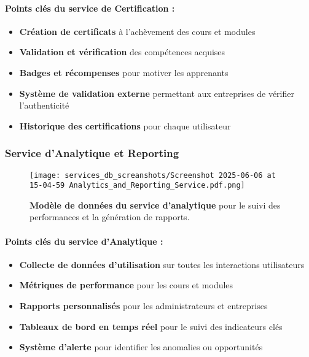 \paragraph{Points clés du service de Certification :}
\begin{itemize}[leftmargin=*,noitemsep,topsep=0pt]
  \item \textbf{Création de certificats} à l'achèvement des cours et modules
  \item \textbf{Validation et vérification} des compétences acquises
  \item \textbf{Badges et récompenses} pour motiver les apprenants
  \item \textbf{Système de validation externe} permettant aux entreprises de vérifier l'authenticité
  \item \textbf{Historique des certifications} pour chaque utilisateur
\end{itemize}
\normalsize
\newpage

\subsubsection{Service d'Analytique et Reporting}
\begin{figure}[h!]
  \centering
  \texttt{[image: services\_db\_screanshots/Screenshot 2025-06-06 at 15-04-59 Analytics\_and\_Reporting\_Service.pdf.png]}
  \caption{\textbf{Modèle de données du service d'analytique} pour le suivi des performances et la génération de rapports.}
  \label{fig:analytics_service}
\end{figure}
\vspace{-10pt}
\small
\paragraph{Points clés du service d'Analytique :}
\begin{itemize}[leftmargin=*,noitemsep,topsep=0pt]
  \item \textbf{Collecte de données d'utilisation} sur toutes les interactions utilisateurs
  \item \textbf{Métriques de performance} pour les cours et modules
  \item \textbf{Rapports personnalisés} pour les administrateurs et entreprises
  \item \textbf{Tableaux de bord en temps réel} pour le suivi des indicateurs clés
  \item \textbf{Système d'alerte} pour identifier les anomalies ou opportunités
\end{itemize}
\normalsize
\newpage

